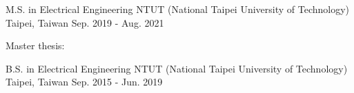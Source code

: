 

\begin{cventries}

  \cventry
    {M.S. in Electrical Engineering} %
    {NTUT (National Taipei University of Technology)} %
    {Taipei, Taiwan} %
    {Sep. 2019 - Aug. 2021} %
    {
      \begin{cvitems} %
        \item {Master thesis: \href{https://drive.google.com/file/d/1-yuTVxgvFh_omxGQpmZeBhg4gtdNKvf0/view?usp=sharing}{}}
      \end{cvitems}
    }

  \cventry
    {B.S. in Electrical Engineering} %
    {NTUT (National Taipei University of Technology)} %
    {Taipei, Taiwan} %
    {Sep. 2015 - Jun. 2019} %
    {
    }

\end{cventries}
